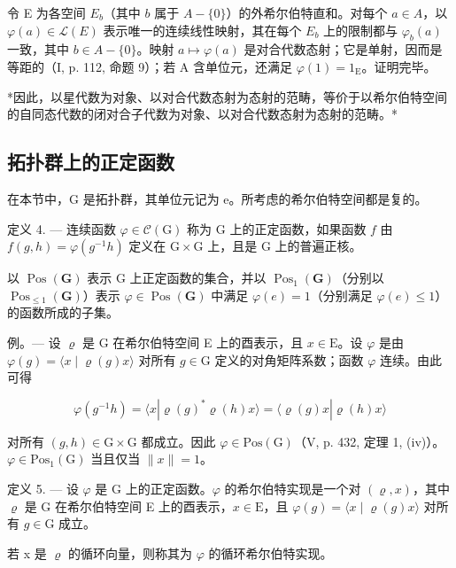令 E 为各空间 \(E_{b}\)（其中 \(b\) 属于 \(A - \{0\}\)）的外希尔伯特直和。对每个 \(a \in A\)，以 \(\varphi(a) \in \mathcal{L}(E)\) 表示唯一的连续线性映射，其在每个 \(E_{b}\) 上的限制都与 \(\varphi_{b}(a)\) 一致，其中 \(b \in A - \{0\}\)。映射 \(a \mapsto \varphi(a)\) 是对合代数态射；它是单射，因而是等距的（I, p. 112, 命题 9）；若 A 含单位元，还满足 \(\varphi(1) = 1_{\mathrm{E}}\)。证明完毕。

*因此，以星代数为对象、以对合代数态射为态射的范畴，等价于以希尔伯特空间的自同态代数的闭对合子代数为对象、以对合代数态射为态射的范畴。*

\subsection{拓扑群上的正定函数}

在本节中，G 是拓扑群，其单位元记为 e。所考虑的希尔伯特空间都是复的。

定义 4. --- 连续函数 \(\varphi\in\mathcal{C}(\mathrm{G})\) 称为 G 上的正定函数，如果函数 \(f\) 由 \(f(g,h)=\varphi(g^{-1}h)\) 定义在 \(\mathrm{G}\times\mathrm{G}\) 上，且是 \(\mathrm{G}\) 上的普遍正核。

以 \(\operatorname{Pos}(\mathbf{G})\) 表示 G 上正定函数的集合，并以 \(\operatorname{Pos}_{1}(\mathbf{G})\)（分别以 \(\operatorname{Pos}_{\leqslant1}(\mathbf{G})\)）表示 \(\varphi\in\operatorname{Pos}(\mathbf{G})\) 中满足 \(\varphi(e)=1\)（分别满足 \(\varphi(e)\leqslant1\)）的函数所成的子集。

例。--- 设 \(\varrho\) 是 G 在希尔伯特空间 E 上的酉表示，且 \(x \in \mathrm{E}\)。设 \(\varphi\) 是由 \(\varphi(g) = \langle x \mid \varrho(g)x \rangle\) 对所有 \(g \in \mathrm{G}\) 定义的对角矩阵系数；函数 \(\varphi\) 连续。由此可得

\[
\varphi (g ^ {- 1} h) = \langle x | \varrho (g) ^ {*} \varrho (h) x \rangle = \langle \varrho (g) x | \varrho (h) x \rangle
\]

对所有 \((g,h)\in\mathrm{G}\times\mathrm{G}\) 都成立。因此 \(\varphi\in\mathrm{Pos}(\mathrm{G})\)（V, p. 432, 定理 1, (iv)）。\(\varphi\in\mathrm{Pos}_{1}(\mathrm{G})\) 当且仅当 \(\|x\|=1\)。

定义 5. --- 设 \(\varphi\) 是 G 上的正定函数。\(\varphi\) 的希尔伯特实现是一个对 \((\varrho, x)\)，其中 \(\varrho\) 是 G 在希尔伯特空间 E 上的酉表示，\(x \in \mathrm{E}\)，且 \(\varphi(g) = \langle x \mid \varrho(g)x \rangle\) 对所有 \(g \in \mathrm{G}\) 成立。

若 x 是 \(\varrho\) 的循环向量，则称其为 \(\varphi\) 的循环希尔伯特实现。

